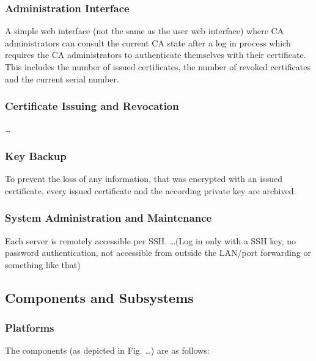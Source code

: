 \documentclass{article}
\begin{document}
\subsubsection{Administration Interface}

A simple web interface (not the same as the user web interface) where CA administrators can consult the current CA state after a log in process which requires the CA administrators to authenticate themselves with their certificate. This includes the number of issued certificates, the number of revoked certificates and the current serial number.

\subsubsection{Certificate Issuing and Revocation}

\dots

\subsubsection{Key Backup}

To prevent the loss of any information, that was encrypted with an issued certificate, every issued certificate and the according private key are archived.

\subsubsection{System Administration and Maintenance}

Each server is remotely accessible per SSH. \dots (Log in only with a SSH key, no password authentication, not accessible from outside the LAN/port forwarding or something like that)

\subsection{Components and Subsystems}

\subsubsection{Platforms}
The components (as depicted in Fig. \dots) are as follows:
\end{document}
